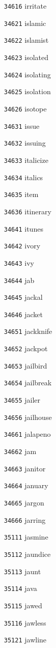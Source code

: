 \documentclass[twoside,11pt]{article}
\begin{document}
\begin{multicols}{5}
\begin{enumerate}
\item[\texttt{34616}] irritate
\item[\texttt{34621}] islamic
\item[\texttt{34622}] islamist
\item[\texttt{34623}] isolated
\item[\texttt{34624}] isolating
\item[\texttt{34625}] isolation
\item[\texttt{34626}] isotope
\item[\texttt{34631}] issue
\item[\texttt{34632}] issuing
\item[\texttt{34633}] italicize
\item[\texttt{34634}] italics
\item[\texttt{34635}] item
\item[\texttt{34636}] itinerary
\item[\texttt{34641}] itunes
\item[\texttt{34642}] ivory
\item[\texttt{34643}] ivy
\item[\texttt{34644}] jab
\item[\texttt{34645}] jackal
\item[\texttt{34646}] jacket
\item[\texttt{34651}] jackknife
\item[\texttt{34652}] jackpot
\item[\texttt{34653}] jailbird
\item[\texttt{34654}] jailbreak
\item[\texttt{34655}] jailer
\item[\texttt{34656}] jailhouse
\item[\texttt{34661}] jalapeno
\item[\texttt{34662}] jam
\item[\texttt{34663}] janitor
\item[\texttt{34664}] january
\item[\texttt{34665}] jargon
\item[\texttt{34666}] jarring
\item[\texttt{35111}] jasmine
\item[\texttt{35112}] jaundice
\item[\texttt{35113}] jaunt
\item[\texttt{35114}] java
\item[\texttt{35115}] jawed
\item[\texttt{35116}] jawless
\item[\texttt{35121}] jawline

\end{enumerate}
\end{multicols}
\end{document}
